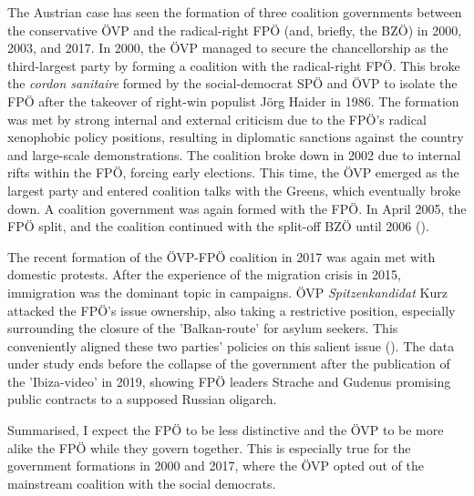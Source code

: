 \documentclass{article}
\begin{document}
The Austrian case has seen the formation of three coalition governments between the conservative ÖVP and the radical-right FPÖ (and, briefly, the BZÖ) in 2000, 2003, and 2017. In 2000, the ÖVP managed to secure the chancellorship as the third-largest party by forming a coalition with the radical-right FPÖ. This broke the \textit{cordon sanitaire} formed by the social-democrat SPÖ and ÖVP to isolate the FPÖ after the takeover of right-win populist Jörg Haider in 1986. The formation was met by strong internal and external criticism due to the FPÖ's radical xenophobic policy positions, resulting in diplomatic sanctions against the country and large-scale demonstrations. The coalition broke down in 2002 due to internal rifts within the FPÖ, forcing early elections. This time, the ÖVP emerged as the largest party and entered coalition talks with the Greens, which eventually broke down. A coalition government was again formed with the FPÖ. In April 2005, the FPÖ split, and the coalition continued with the split-off BZÖ until 2006 (\cite{Luther2010}).\par

The recent formation of the ÖVP-FPÖ coalition in 2017 was again met with domestic protests. After the experience of the migration crisis in 2015, immigration was the dominant topic in campaigns. ÖVP \textit{Spitzenkandidat} Kurz attacked the FPÖ's issue ownership, also taking  a restrictive position, especially surrounding the closure of the 'Balkan-route' for asylum seekers. This conveniently aligned these two parties' policies on this salient issue (\cite{Bodlos2018}). The data under study ends before the collapse of the government after the publication of the 'Ibiza-video' in 2019, showing FPÖ leaders Strache and Gudenus promising public contracts to a supposed Russian oligarch.\par 

Summarised, I expect the FPÖ to be less distinctive and the ÖVP to be more alike the FPÖ while they govern together. This is especially true for the government formations in 2000 and 2017, where the ÖVP opted out of the mainstream coalition with the social democrats. \par
\end{document}
